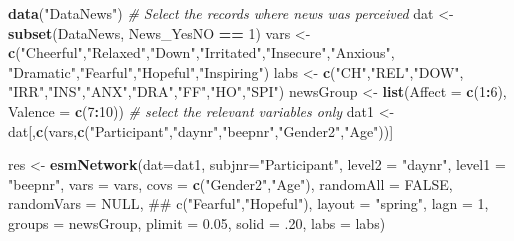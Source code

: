 \documentclass[man,floatsintext]{apa6}
\newenvironment{Shaded}{\begin{snugshade}}{\end{snugshade}}
\newcommand{\KeywordTok}[1]{\textcolor[rgb]{0.13,0.29,0.53}{\textbf{#1}}}
\newcommand{\DataTypeTok}[1]{\textcolor[rgb]{0.13,0.29,0.53}{#1}}
\newcommand{\DecValTok}[1]{\textcolor[rgb]{0.00,0.00,0.81}{#1}}
\newcommand{\FloatTok}[1]{\textcolor[rgb]{0.00,0.00,0.81}{#1}}
\newcommand{\StringTok}[1]{\textcolor[rgb]{0.31,0.60,0.02}{#1}}
\newcommand{\CommentTok}[1]{\textcolor[rgb]{0.56,0.35,0.01}{\textit{#1}}}
\newcommand{\OtherTok}[1]{\textcolor[rgb]{0.56,0.35,0.01}{#1}}
\newcommand{\OperatorTok}[1]{\textcolor[rgb]{0.81,0.36,0.00}{\textbf{#1}}}
\newcommand{\NormalTok}[1]{#1}
\begin{document}
\begin{Shaded}
\begin{Highlighting}[]
\KeywordTok{data}\NormalTok{(}\StringTok{"DataNews"}\NormalTok{)}
 \CommentTok{# Select the records where news was perceived}
\NormalTok{dat <-}\StringTok{ }\KeywordTok{subset}\NormalTok{(DataNews, News_YesNO }\OperatorTok{==}\StringTok{ }\DecValTok{1}\NormalTok{)      }
\NormalTok{vars <-}\StringTok{ }\KeywordTok{c}\NormalTok{(}\StringTok{"Cheerful"}\NormalTok{,}\StringTok{"Relaxed"}\NormalTok{,}\StringTok{"Down"}\NormalTok{,}\StringTok{"Irritated"}\NormalTok{,}\StringTok{"Insecure"}\NormalTok{,}\StringTok{"Anxious"}\NormalTok{,}
          \StringTok{"Dramatic"}\NormalTok{,}\StringTok{"Fearful"}\NormalTok{,}\StringTok{"Hopeful"}\NormalTok{,}\StringTok{"Inspiring"}\NormalTok{)}
\NormalTok{labs <-}\StringTok{ }\KeywordTok{c}\NormalTok{(}\StringTok{"CH"}\NormalTok{,}\StringTok{"REL"}\NormalTok{,}\StringTok{"DOW"}\NormalTok{, }\StringTok{"IRR"}\NormalTok{,}\StringTok{"INS"}\NormalTok{,}\StringTok{"ANX"}\NormalTok{,}\StringTok{"DRA"}\NormalTok{,}\StringTok{"FF"}\NormalTok{,}\StringTok{"HO"}\NormalTok{,}\StringTok{"SPI"}\NormalTok{)}
\NormalTok{newsGroup <-}\StringTok{ }\KeywordTok{list}\NormalTok{(}\DataTypeTok{Affect =} \KeywordTok{c}\NormalTok{(}\DecValTok{1}\OperatorTok{:}\DecValTok{6}\NormalTok{), }\DataTypeTok{Valence =} \KeywordTok{c}\NormalTok{(}\DecValTok{7}\OperatorTok{:}\DecValTok{10}\NormalTok{))}
 \CommentTok{# select the relevant variables only}
\NormalTok{dat1 <-}\StringTok{ }\NormalTok{dat[,}\KeywordTok{c}\NormalTok{(vars,}\KeywordTok{c}\NormalTok{(}\StringTok{"Participant"}\NormalTok{,}\StringTok{"daynr"}\NormalTok{,}\StringTok{"beepnr"}\NormalTok{,}\StringTok{"Gender2"}\NormalTok{,}\StringTok{"Age"}\NormalTok{))]    }

\NormalTok{res <-}\StringTok{ }\KeywordTok{esmNetwork}\NormalTok{(}\DataTypeTok{dat=}\NormalTok{dat1, }
                  \DataTypeTok{subjnr=}\StringTok{"Participant"}\NormalTok{, }
                  \DataTypeTok{level2 =} \StringTok{"daynr"}\NormalTok{, }
                  \DataTypeTok{level1 =} \StringTok{"beepnr"}\NormalTok{,}
                  \DataTypeTok{vars =}\NormalTok{ vars,}
                  \DataTypeTok{covs =} \KeywordTok{c}\NormalTok{(}\StringTok{"Gender2"}\NormalTok{,}\StringTok{"Age"}\NormalTok{),}
                  \DataTypeTok{randomAll =} \OtherTok{FALSE}\NormalTok{,}
                  \DataTypeTok{randomVars =}  \OtherTok{NULL}\NormalTok{,   ## c("Fearful","Hopeful"),}
                  \DataTypeTok{layout =} \StringTok{"spring"}\NormalTok{,}
                  \DataTypeTok{lagn =} \DecValTok{1}\NormalTok{,}
                  \DataTypeTok{groups =}\NormalTok{ newsGroup,}
                  \DataTypeTok{plimit =} \FloatTok{0.05}\NormalTok{,}
                  \DataTypeTok{solid =}\NormalTok{ .}\DecValTok{20}\NormalTok{,}
                  \DataTypeTok{labs =}\NormalTok{ labs)}
\end{Highlighting}
\end{Shaded}
\end{document}
